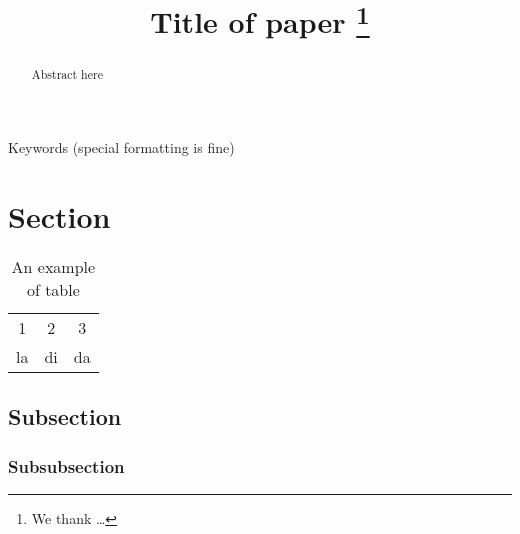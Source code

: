 \documentclass{salt}
\title[Short title]{Title of paper                   %
  \thanks{We thank \ldots}}
\author[Short author]{%
  \saltauthor{Author1 \\ \institute{Institute1}} \AND
  \saltauthor{Author2 \\ \institute{Institute2}} \AND
  \saltauthor{Author3 \\ \institute{Institute3}}%
}
\begin{document}

\maketitle

%

%
%

\begin{abstract}  
  Abstract here
\end{abstract}

\begin{keywords}
  Keywords (special formatting is fine)
\end{keywords}


\section{Section}

\begin{table}
  \begin{tabular}{c|c|c}
     1 & 2 & 3 \\
     la & di & da \\
  \end{tabular}
  \caption{An example of table}
  \label{my_table}
\end{table}

\subsection{Subsection}

\subsubsection{Subsubsection}
\end{document}
